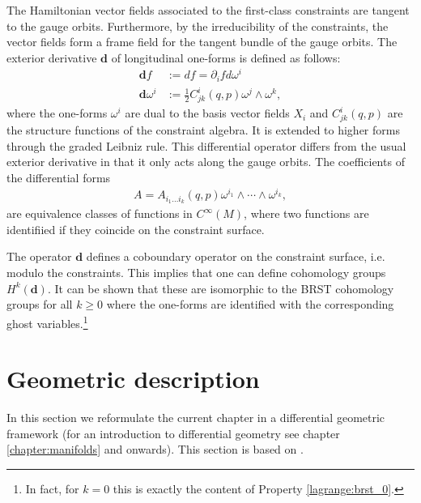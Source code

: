     The Hamiltonian vector fields associated to the first-class constraints are tangent to the gauge orbits. Furthermore, by the irreducibility of the constraints, the vector fields form a frame field for the tangent bundle of the gauge orbits.
    The exterior derivative $\mathbf{d}$ of longitudinal one-forms is defined as follows:
    \begin{align}
        \mathbf{d}f &:= df = \partial_ifd\omega^i\\
        \mathbf{d}\omega^i &:= \frac{1}{2}C^i_{jk}(q,p)\omega^j\wedge\omega^k,
    \end{align}
    where the one-forms $\omega^i$ are dual to the basis vector fields $X_i$ and $C^i_{jk}(q,p)$ are the structure functions of the constraint algebra. It is extended to higher forms through the graded Leibniz rule. This differential operator differs from the usual exterior derivative in that it only acts along the gauge orbits. The coefficients of the differential forms
    \begin{gather}
        A = A_{i_1\ldots i_k}(q,p)\omega^{i_1}\wedge\cdots\wedge\omega^{i_k},
    \end{gather}
    are equivalence classes of functions in $C^\infty(M)$, where two functions are identifiied if they coincide on the constraint surface.
    \begin{property}[Cohomology]
        The operator $\mathbf{d}$ defines a coboundary operator on the constraint surface, i.e. modulo the constraints. This implies that one can define cohomology groups $H^k(\mathbf{d})$. It can be shown that these are isomorphic to the BRST cohomology groups for all $k\geq0$ where the one-forms are identified with the corresponding ghost variables.\footnote{In fact, for $k=0$ this is exactly the content of Property \ref{lagrange:brst_0}.}
    \end{property}

\section{Geometric description}

    In this section we reformulate the current chapter in a differential geometric framework (for an introduction to differential geometry see chapter \ref{chapter:manifolds} and onwards). This section is based on \cite{palais_solitons}.

